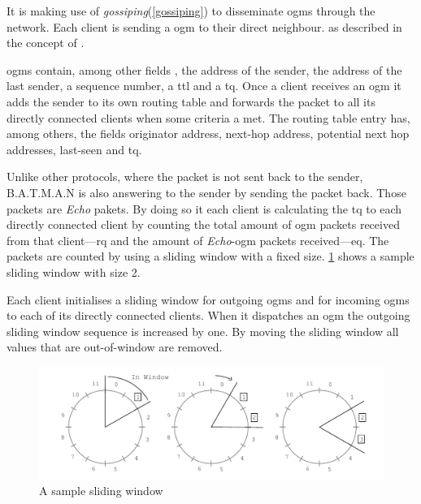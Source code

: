It is making use of \textit{gossiping}(\ref{gossiping}) to disseminate \glspl{ogm} through the network. Each client is sending a \gls{ogm} to their direct neighbour.  as described in the concept of \citet{batman}.

\Glspl{ogm} contain, among other fields \cite[\S2]{tobias_hardes}, the address of the sender, the address of the last sender, a sequence number, a \gls{ttl} and a \gls{tq}. 
Once a client receives an \gls{ogm} it adds the sender to its own routing table and forwards the packet to all its directly connected clients when some criteria a met. 
The routing table entry has, among others\cite[\S2.1]{tobias_hardes}, the fields originator address, next-hop address, potential next hop addresses, last-seen and \gls{tq}.

Unlike other protocols, where the packet is not sent back to the sender, B.A.T.M.A.N is also answering to the sender by sending the packet back. Those packets are \textit{Echo} pakets. By doing so it each client is calculating the \gls{tq} to each directly connected client by counting the total amount of \gls{ogm} packets received from that client—\gls{rq} and the amount of \textit{Echo}-\gls{ogm} packets received—\gls{eq}. 
The packets are counted by using a sliding window \cite[\S3.4]{tanenbaum_wetherall_2011} with a fixed size. \cref{fig:sliding-window} shows a sample sliding window with size 2. 

Each client initialises a sliding window for outgoing \glspl{ogm} and for incoming \glspl{ogm} to each of its directly connected clients. When it dispatches an \gls{ogm} the outgoing sliding window sequence is increased by one. By moving the sliding window all values that are out-of-window are removed.

\begin{figure}
\centering
\includegraphics[width=1\textwidth]{graphics/sliding-window.pdf}
\caption{A sample sliding window}
\label{fig:sliding-window}
\end{figure}

